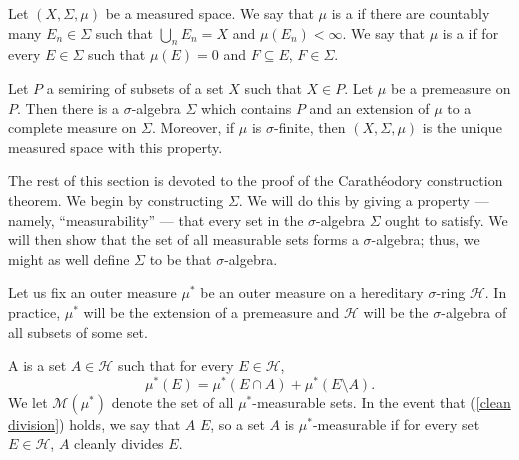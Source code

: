\begin{definition}
Let $(X, \Sigma, \mu)$ be a measured space.
We say that $\mu$ is a  if there are countably many $E_{n} \in \Sigma$ such that $\bigcup_{n} E_{n} = X$ and $\mu(E_{n}) < \infty$.
We say that $\mu$ is a  if for every $E \in \Sigma$ such that $\mu(E) = 0$ and $F \subseteq E$, $F \in \Sigma$.
\end{definition}

\begin{theorem}
Let $P$ a semiring of subsets of a set $X$ such that $X \in P$.
Let $\mu$ be a premeasure on $P$.
Then there is a $\sigma$-algebra $\Sigma$ which contains $P$ and an extension of $\mu$ to a complete measure on $\Sigma$.
Moreover, if $\mu$ is $\sigma$-finite, then $(X, \Sigma, \mu)$ is the unique measured space with this property.
\end{theorem}

\begin{subsec}
The rest of this section is devoted to the proof of the Carathéodory construction theorem.
We begin by constructing $\Sigma$.
We will do this by giving a property --- namely, ``measurability'' --- that every set in the $\sigma$-algebra $\Sigma$ ought to satisfy.
We will then show that the set of all measurable sets forms a $\sigma$-algebra; thus, we might as well define $\Sigma$ to be that $\sigma$-algebra.
\end{subsec}

\begin{subsec}
Let us fix an outer measure $\mu^*$ be an outer measure on a hereditary $\sigma$-ring $\mathcal H$.
In practice, $\mu^*$ will be the extension of a premeasure and $\mathcal H$ will be the $\sigma$-algebra of all subsets of some set.
\end{subsec}

\begin{definition}
A  is a set $A \in \mathcal H$ such that for every $E \in \mathcal H$,
\begin{equation}\label{clean division}
\mu^*(E) = \mu^*(E \cap A) + \mu^*(E \setminus A).
\end{equation}
We let $\mathcal M(\mu^*)$ denote the set of all $\mu^*$-measurable sets.
In the event that (\ref{clean division}) holds, we say that $A$  $E$, so a set $A$ is $\mu^*$-measurable if for every set $E \in \mathcal H$, $A$ cleanly divides $E$.
\end{definition}

